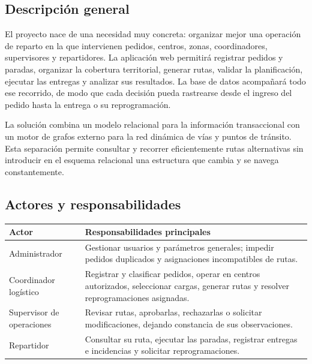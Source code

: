 \documentclass[12pt,a4paper]{article}
\begin{document}
\subsection{Descripción general}
El proyecto nace de una necesidad muy concreta: organizar mejor una operación de reparto en la que intervienen pedidos, centros, zonas, coordinadores, supervisores y repartidores. La aplicación web permitirá registrar pedidos y paradas, organizar la cobertura territorial, generar rutas, validar la planificación, ejecutar las entregas y analizar sus resultados. La base de datos acompañará todo ese recorrido, de modo que cada decisión pueda rastrearse desde el ingreso del pedido hasta la entrega o su reprogramación.

La solución combina un modelo relacional para la información transaccional con un motor de grafos externo para la red dinámica de vías y puntos de tránsito. Esta separación permite consultar y recorrer eficientemente rutas alternativas sin introducir en el esquema relacional una estructura que cambia y se navega constantemente.

\subsection{Actores y responsabilidades}
\begin{longtable}{p{}p{}}
\toprule
\textbf{Actor} & \textbf{Responsabilidades principales}\\
\midrule
Administrador & Gestionar usuarios y parámetros generales; impedir pedidos duplicados y asignaciones incompatibles de rutas.\\
Coordinador logístico & Registrar y clasificar pedidos, operar en centros autorizados, seleccionar cargas, generar rutas y resolver reprogramaciones asignadas.\\
Supervisor de operaciones & Revisar rutas, aprobarlas, rechazarlas o solicitar modificaciones, dejando constancia de sus observaciones.\\
Repartidor & Consultar su ruta, ejecutar las paradas, registrar entregas e incidencias y solicitar reprogramaciones.\\
\bottomrule
\end{longtable}
\end{document}
